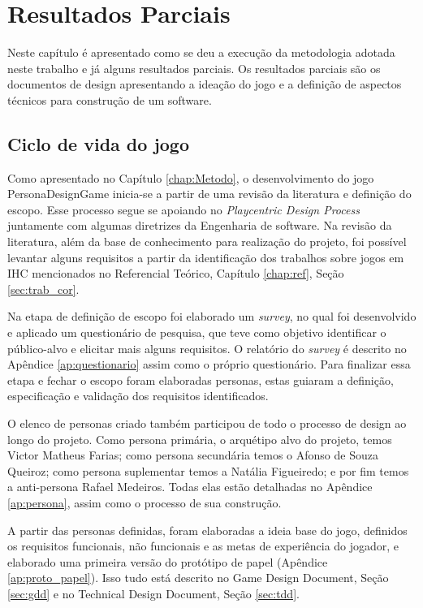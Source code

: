 \chapter{Resultados Parciais}
\label{chap:des}

Neste capítulo é apresentado como se deu a execução da metodologia adotada neste trabalho e já alguns resultados parciais. Os resultados parciais são os documentos de design apresentando a ideação do jogo e a definição de aspectos técnicos para construção de um software.

\section{Ciclo de vida do jogo}

Como apresentado no Capítulo \ref{chap:Metodo}, o desenvolvimento do jogo PersonaDesignGame inicia-se a partir de uma revisão da literatura e definição do escopo. Esse processo segue se apoiando no \textit{Playcentric Design Process} juntamente com algumas diretrizes da Engenharia de software. Na revisão da literatura, além da base de conhecimento para realização do projeto, foi possível levantar alguns requisitos a partir da identificação dos trabalhos sobre jogos em IHC mencionados no Referencial Teórico, Capítulo \ref{chap:ref}, Seção \ref{sec:trab_cor}. 

Na etapa de definição de escopo foi elaborado um \textit{survey}, no qual foi desenvolvido e aplicado um questionário de pesquisa, que teve como objetivo identificar o público-alvo e elicitar mais alguns requisitos. O relatório do \textit{survey} é descrito no Apêndice \ref{ap:questionario} assim como o próprio questionário. Para finalizar essa etapa e fechar o escopo foram elaboradas personas, estas guiaram a definição, especificação e validação dos requisitos identificados.

O elenco de personas criado também participou de todo o processo de design ao longo do projeto. Como persona primária, o arquétipo alvo do projeto, temos Victor Matheus Farias; como persona secundária temos o Afonso de Souza Queiroz; como persona suplementar temos a Natália Figueiredo; e por fim temos a anti-persona Rafael Medeiros. Todas elas estão detalhadas no Apêndice \ref{ap:persona}, assim como o processo de sua construção.

{\color{textmodified}
A partir das personas definidas, foram elaboradas a ideia base do jogo, definidos os requisitos funcionais, não funcionais e as metas de experiência do jogador, e elaborado uma primeira versão do protótipo de papel (Apêndice \ref{ap:proto_papel}). Isso tudo está descrito no Game Design Document, Seção \ref{sec:gdd} e no Technical Design Document, Seção \ref{sec:tdd}.
}

